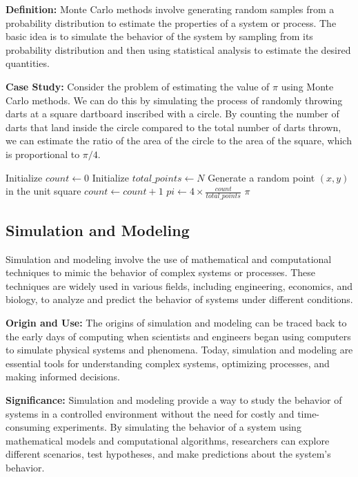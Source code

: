 \documentclass[12pt]{book} %
\begin{document}
\textbf{Definition:} Monte Carlo methods involve generating random samples from a probability distribution to estimate the properties of a system or process. The basic idea is to simulate the behavior of the system by sampling from its probability distribution and then using statistical analysis to estimate the desired quantities.


\textbf{Case Study:} Consider the problem of estimating the value of $\pi$ using Monte Carlo methods. We can do this by simulating the process of randomly throwing darts at a square dartboard inscribed with a circle. By counting the number of darts that land inside the circle compared to the total number of darts thrown, we can estimate the ratio of the area of the circle to the area of the square, which is proportional to $\pi/4$.
\FloatBarrier
\begin{algorithm}
\caption{Monte Carlo Estimation of $\pi$}
\begin{algorithmic}[1]
\State Initialize $count \leftarrow 0$
\State Initialize $total\_points \leftarrow N$
    \State Generate a random point $(x, y)$ in the unit square
        \State $count \leftarrow count + 1$
    \EndIf
\EndFor
\State $pi \leftarrow 4 \times \frac{count}{total\_points}$
\Return $\pi$
\end{algorithmic}
\end{algorithm}
\FloatBarrier

\subsection{Simulation and Modeling}

Simulation and modeling involve the use of mathematical and computational techniques to mimic the behavior of complex systems or processes. These techniques are widely used in various fields, including engineering, economics, and biology, to analyze and predict the behavior of systems under different conditions.

\textbf{Origin and Use:} The origins of simulation and modeling can be traced back to the early days of computing when scientists and engineers began using computers to simulate physical systems and phenomena. Today, simulation and modeling are essential tools for understanding complex systems, optimizing processes, and making informed decisions.

\textbf{Significance:} Simulation and modeling provide a way to study the behavior of systems in a controlled environment without the need for costly and time-consuming experiments. By simulating the behavior of a system using mathematical models and computational algorithms, researchers can explore different scenarios, test hypotheses, and make predictions about the system's behavior.
\end{document}
